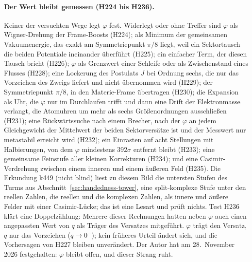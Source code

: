 \paragraph{Der Wert bleibt gemessen (H224 bis H236).}
Keiner der versuchten Wege legt \(\varphi\) fest. Widerlegt oder ohne Treffer sind \(\varphi\) als Wigner-Drehung der Frame-Boosts (H224); als
Minimum der gemeinsamen Vakuumenergie, das exakt am Symmetriepunkt \(\pi/8\) liegt, weil ein Sektortausch die beiden Potentiale ineinander
überführt (H225); ein einfacher Term, der diesen Tausch bricht (H226); \(\varphi\) als Grenzwert einer Schleife oder als Zwischenstand eines
Flusses (H228); eine Lockerung des Postulats \(J\) bei Ordnung sechs, die nur das Vorzeichen des Zweigs liefert und nicht übernommen wird
(H229); der Symmetriepunkt \(\pi/8\), in den Materie-Frame übertragen (H230); die Expansion als Uhr, die \(\varphi\) nur im Durchlaufen trifft und
dann eine Drift der Elektronmasse verlangt, die Atomuhren um mehr als sechs Größenordnungen ausschließen (H231); eine Rückwärtssuche nach einem
Brecher, nach der \(\varphi\) an jedem Gleichgewicht der Mittelwert der beiden Sektorversätze ist und der Messwert nur metastabil erreicht wird
(H232); ein Einrasten auf acht Stellungen mit Halbierungen, von dem \(\varphi\) mindestens \(392\sigma\) entfernt bleibt (H233); eine gemeinsame
Feinstufe aller kleinen Korrekturen (H234); und eine Casimir-Verdrehung zwischen einem inneren und einem äußeren Feld (H235). Die Erkundung
k449 (nicht blind) liest zu diesem Bild die untersten Stufen des Turms aus Abschnitt~\ref{sec:handedness-tower}, eine split-komplexe Stufe
unter den reellen Zahlen, die reellen und die komplexen Zahlen, als innere und äußere Felder mit einer Casimir-Lücke; das ist eine Lesart und
prüft nichts. Test H236 klärt eine Doppelzählung: Mehrere dieser Rechnungen hatten neben \(\varphi\) auch einen angepassten Wert von \(q\) als
Träger des Versatzes mitgeführt. \(\varphi\) trägt den Versatz, \(q\) nur das Vorzeichen (\(q\to0^-\)); kein früheres Urteil ändert sich, und die
Vorhersagen von H227 bleiben unverändert. Der Autor hat am 28.~November 2026 festgehalten: \(\varphi\) bleibt offen, und dieser Strang ruht.

